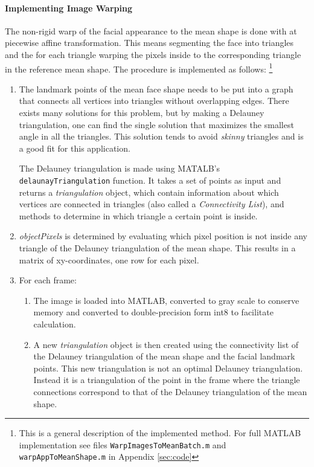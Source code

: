 \documentclass[Main]{subfiles}
\begin{document}
			\paragraph{Implementing Image Warping} %
				\label{par:implementing_image_warping}
				The non-rigid warp of the facial appearance to the mean shape is done with at piecewise affine transformation.
				This means segmenting the face into triangles and the for each triangle warping the pixels inside to the corresponding triangle in the reference mean shape.
				The procedure is implemented as follows:
				\footnote{
					This is a general description of the implemented method. 
					For full MATLAB implementation see files \texttt{WarpImagesToMeanBatch.m} and \texttt{warpAppToMeanShape.m} in Appendix {\ref{sec:code}}
					}
				\begin{enumerate}
					\item
					The landmark points of the mean face shape needs to be put into a graph that connects all vertices into triangles without overlapping edges.
					There exists many solutions for this problem, but by making a Delauney triangulation, one can find the single solution that maximizes the smallest angle in all the triangles.
					This solution tends to avoid \emph{skinny} triangles and is a good fit for this application.

					The Delauney triangulation is made using MATALB's \texttt{delaunayTriangulation} function.
					It takes a set of points as input and returns a \emph{triangulation} object, which contain information about which vertices are connected in triangles (also called a \emph{Connectivity List}), and methods to determine in which triangle a certain point is inside.

					\item
					\emph{objectPixels} is determined by evaluating which pixel position is not inside any triangle of the Delauney triangulation of the mean shape.
					This results in a matrix of xy-coordinates, one row for each pixel.

					\item
					For each frame:
					\begin{enumerate}[label=\Roman*.]
						\item
						The image is loaded into MATLAB, converted to gray scale to conserve memory and converted to double-precision form int8 to facilitate calculation.

						\item 
						A new \emph{triangulation} object is then created using the connectivity list of the Delauney triangulation of the mean shape and the facial landmark points.
						This new triangulation is not an optimal Delauney triangulation.
						Instead it is a triangulation of the point in the frame where the triangle connections correspond to that of the Delauney triangulation of the mean shape.


\end{enumerate}
\end{enumerate}
\end{document}
